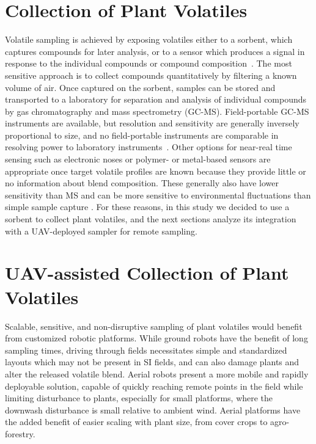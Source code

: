 \section{Collection of Plant Volatiles}

Volatile sampling is achieved by exposing volatiles either to a sorbent, which captures compounds for later analysis, or to a sensor which produces a signal in response to the individual compounds or compound composition~\cite{tholl_trends_2021}. The most sensitive approach is to collect compounds quantitatively by filtering a known volume of air. Once captured on the sorbent, samples can be stored and transported to a laboratory for separation and analysis of individual compounds by gas chromatography and mass spectrometry (GC-MS). Field-portable GC-MS instruments are available, but resolution and sensitivity are generally inversely proportional to size, and no field-portable instruments are comparable in resolving power to laboratory instruments~\cite{tholl_trends_2021, lang_ecological_2022}. Other options for near-real time sensing such as electronic noses or polymer- or metal-based sensors are appropriate once target volatile profiles are known because they provide little or no information about blend composition. These generally also have lower sensitivity than MS and can be more sensitive to environmental fluctuations than simple sample capture \cite{tholl_trends_2021, lang_ecological_2022}. For these reasons, in this study we decided to use a sorbent to collect plant volatiles, and the next sections analyze its integration with a UAV-deployed sampler for remote sampling.

\section{UAV-assisted Collection of Plant Volatiles}

Scalable, sensitive, and non-disruptive sampling of plant volatiles would benefit from customized robotic platforms. While ground robots have the benefit of long sampling times, driving through fields necessitates simple and standardized layouts which may not be present in SI fields, and can also damage plants and alter the released volatile blend. Aerial robots present a more mobile and rapidly deployable solution, capable of quickly reaching remote points in the field while limiting disturbance to plants, especially for small platforms, where the downwash disturbance is small relative to ambient wind. Aerial platforms have the added benefit of easier scaling with plant size, from cover crops to agro-forestry.

